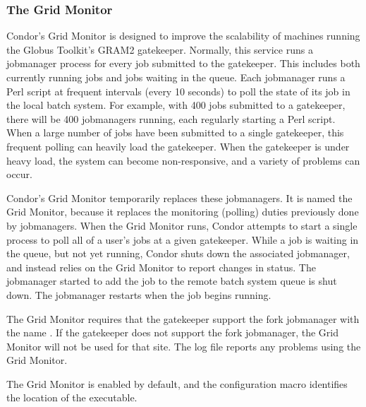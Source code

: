 \subsubsection{\label{sec:Condor-G-GridMonitor}The Grid Monitor}

Condor's Grid Monitor is designed to improve the scalability of
machines running the Globus Toolkit's GRAM2 gatekeeper.
Normally, this service runs a jobmanager process for 
every job submitted to the gatekeeper.
This includes both currently running jobs and jobs waiting in the queue.
Each jobmanager runs a Perl script at
frequent intervals (every 10 seconds) to poll the state of
its job in the local batch system.
For example, with 400 jobs submitted to a gatekeeper,
there will be 400 jobmanagers running,
each regularly starting a Perl script.
When a large number of jobs
have been submitted to a single gatekeeper,
this frequent polling can heavily load the gatekeeper.
When the gatekeeper is under heavy load,
the system can become non-responsive, and a variety of problems can occur.

Condor's Grid Monitor temporarily replaces these jobmanagers.
It is named the Grid Monitor, because it replaces the monitoring
(polling) duties previously done by jobmanagers.
When the Grid Monitor runs,
Condor attempts to start a single
process to poll all of a user's jobs at a given gatekeeper.
While a job is waiting in the queue, but not yet running,
Condor shuts down the associated jobmanager,
and instead relies on the Grid Monitor to report changes in status.
The jobmanager started to add the job to the remote
batch system queue is shut down.
The jobmanager restarts when the job begins running.

The Grid Monitor requires that the gatekeeper support the fork
jobmanager with the name .
If the gatekeeper does not support the fork jobmanager,
the Grid Monitor will not be used for that site.
The  log file reports any problems
using the Grid Monitor.

The Grid Monitor is enabled by default,
and the
configuration macro  identifies
the location of the executable.

